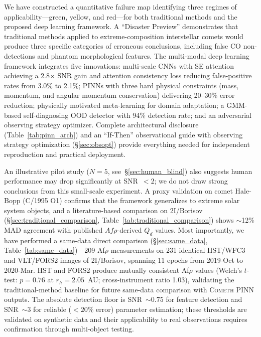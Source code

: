 \documentclass[usenatbib]{mnras}
\begin{document}
We have constructed a quantitative failure map identifying three regimes of applicability---green, yellow, and red---for both traditional methods and the proposed deep learning framework. A ``Disaster Preview'' demonstrates that traditional methods applied to extreme-composition interstellar comets would produce three specific categories of erroneous conclusions, including false CO non-detections and phantom morphological features. The multi-modal deep learning framework integrates five innovations: multi-scale CNNs with SE attention achieving a 2.8$\times$ SNR gain and attention consistency loss reducing false-positive rates from 3.0\% to 2.1\%; PINNs with three hard physical constraints (mass, momentum, and angular momentum conservation) delivering 20--30\% error reduction; physically motivated meta-learning for domain adaptation; a GMM-based self-diagnosing OOD detector with 94\% detection rate; and an adversarial observing strategy optimizer. Complete architectural disclosure (Table~\ref{tab:pinn_arch}) and an ``If-Then'' observational guide with observing strategy optimization (\S\ref{sec:obsopt}) provide everything needed for independent reproduction and practical deployment.

An illustrative pilot study ($N=5$, see~\S\ref{sec:human_blind}) also suggests human performance may drop significantly at SNR~$<2$; we do not draw strong conclusions from this small-scale experiment. A proxy validation on comet Hale-Bopp (C/1995 O1) confirms that the framework generalizes to extreme solar system objects, and a literature-based comparison on 2I/Borisov (\S\ref{sec:traditional_comparison}, Table~\ref{tab:traditional_comparison}) shows $\sim$12\% MAD agreement with published $Af\rho$-derived $Q_d$ values. Most importantly, we have performed a same-data direct comparison (\S\ref{sec:same_data}, Table~\ref{tab:same_data})---209 Af$\rho$ measurements on 231 identical HST/WFC3 and VLT/FORS2 images of 2I/Borisov, spanning 11 epochs from 2019-Oct to 2020-Mar. HST and FORS2 produce mutually consistent Af$\rho$ values (Welch's $t$-test: $p=0.76$ at $r_h=2.05$~AU; cross-instrument ratio 1.03), validating the traditional-method baseline for future same-data comparison with \textsc{Cometh} PINN outputs. The absolute detection floor is SNR~$\sim 0.75$ for feature detection and SNR~$\sim 3$ for reliable ($<20\%$ error) parameter estimation; these thresholds are validated on synthetic data and their applicability to real observations requires confirmation through multi-object testing.
\end{document}
